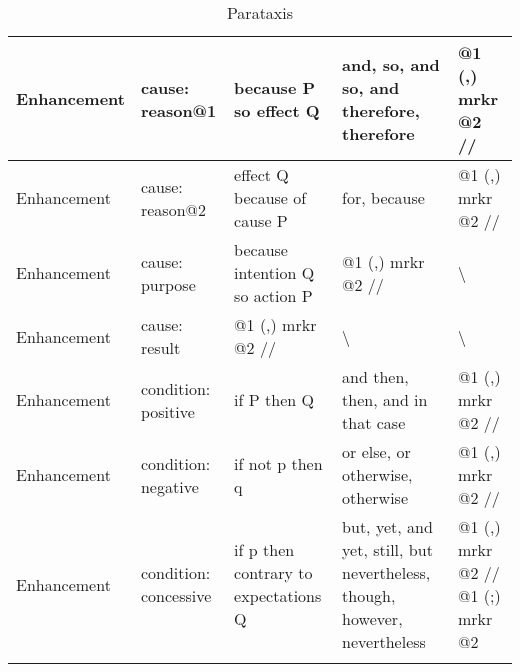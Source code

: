 \begin{landscape}
\begin{longtable}{|l|l|l|l|l|}
			Enhancement & cause: reason@1        & because P so effect Q                & and, so, and so, and therefore, therefore                                              & @1 (,) mrkr @2 //                                                                       \\ \hline
			Enhancement & cause: reason@2        & effect Q because of cause P          & for, because                                                                           & @1 (,) mrkr @2 //                                                                       \\ \hline
			Enhancement & cause: purpose         & because intention Q so action P      & @1 (,) mrkr @2 //                                                                      & \textbackslash                                                                          \\ \hline
			Enhancement & cause: result          & @1 (,) mrkr @2 //                    & \textbackslash                                                                         & \textbackslash                                                                          \\ \hline
			Enhancement & condition: positive    & if P then Q                          & and then, then, and in that case                                                       & @1 (,) mrkr @2 //                                                                       \\ \hline
			Enhancement & condition: negative    & if not p then q                      & or else, or otherwise, otherwise                                                       & @1 (,) mrkr @2 //                                                                       \\ \hline
			Enhancement & condition: concessive  & if p then contrary to expectations Q & but, yet, and yet, still, but nevertheless, though, however, nevertheless              & @1 (,) mrkr @2 // @1 (;) mrkr @2                                                        \\ \hline
			
			\caption{Parataxis}
			\label{tab:parataxis}
		\end{longtable}


\end{landscape}
